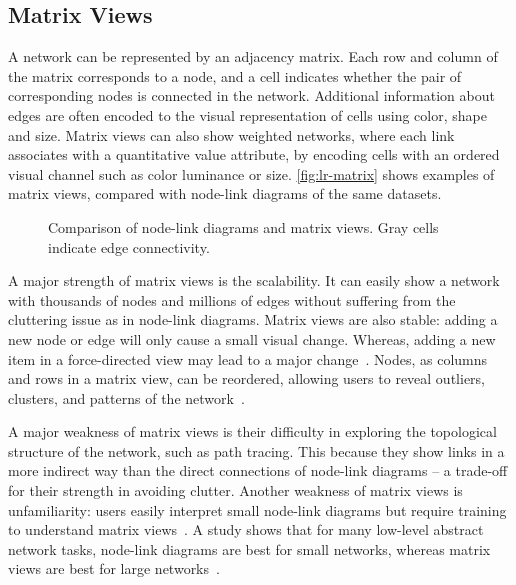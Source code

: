 \subsection{Matrix Views}
A network can be represented by an adjacency matrix. Each row and column of the matrix corresponds to a node, and a cell indicates whether the pair of corresponding nodes is connected in the network. Additional information about edges are often encoded to the visual representation of cells using color, shape and size. Matrix views can also show weighted networks, where each link associates with a quantitative value attribute, by encoding cells with an ordered visual channel such as color luminance or size. \autoref{fig:lr-matrix} shows examples of matrix views, compared with node-link diagrams of the same datasets.

\begin{figure}[!htb]
\centering
{}
\hfill
{}
\hfill
{}
\caption{Comparison of node-link diagrams and matrix views. Gray cells indicate edge connectivity. }
\label{fig:lr-matrix}
\end{figure}

A major strength of matrix views is the scalability. It can easily show a network with thousands of nodes and millions of edges without suffering from the cluttering issue as in node-link diagrams. Matrix views are also stable: adding a new node or edge will only cause a small visual change. Whereas, adding a new item in a force-directed view may lead to a major change~\cite{Munzner2014}. Nodes, as columns and rows in a matrix view, can be reordered, allowing users to reveal outliers, clusters, and patterns of the network~\cite{Henry2007}.

A major weakness of matrix views is their difficulty in exploring the topological structure of the network, such as path tracing. This because they show links in a more indirect way than the direct connections of node-link diagrams -- a trade-off for their strength in avoiding clutter. Another weakness of matrix views is unfamiliarity: users easily interpret small node-link diagrams but require training to understand matrix views~\cite{Munzner2014}. A study shows that for many low-level abstract network tasks, node-link diagrams are best for small networks, whereas matrix views are best for large networks~\cite{Ghoniem2005}.

